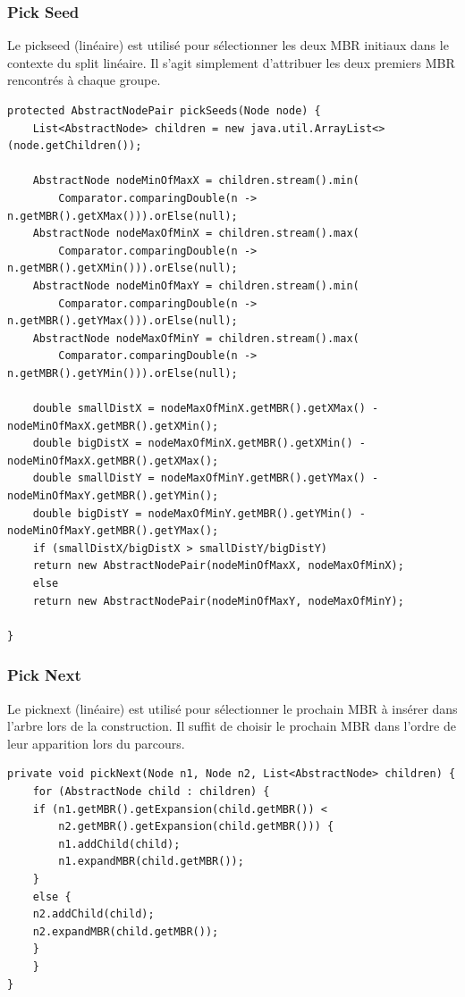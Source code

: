 \documentclass {article}
\begin{document}
\subsubsection {Pick Seed}

Le pickseed (linéaire) est utilisé pour sélectionner les deux MBR initiaux dans le contexte du split linéaire. 
Il s'agit simplement d'attribuer les deux premiers MBR rencontrés à chaque groupe.


\begin{verbatim}
protected AbstractNodePair pickSeeds(Node node) {
    List<AbstractNode> children = new java.util.ArrayList<>(node.getChildren());

    AbstractNode nodeMinOfMaxX = children.stream().min(
	    Comparator.comparingDouble(n -> n.getMBR().getXMax())).orElse(null);
    AbstractNode nodeMaxOfMinX = children.stream().max(
	    Comparator.comparingDouble(n -> n.getMBR().getXMin())).orElse(null);
    AbstractNode nodeMinOfMaxY = children.stream().min(
	    Comparator.comparingDouble(n -> n.getMBR().getYMax())).orElse(null);
    AbstractNode nodeMaxOfMinY = children.stream().max(
	    Comparator.comparingDouble(n -> n.getMBR().getYMin())).orElse(null);

    double smallDistX = nodeMaxOfMinX.getMBR().getXMax() - nodeMinOfMaxX.getMBR().getXMin();
    double bigDistX = nodeMaxOfMinX.getMBR().getXMin() - nodeMinOfMaxX.getMBR().getXMax();
    double smallDistY = nodeMaxOfMinY.getMBR().getYMax() - nodeMinOfMaxY.getMBR().getYMin();
    double bigDistY = nodeMaxOfMinY.getMBR().getYMin() - nodeMinOfMaxY.getMBR().getYMax();
    if (smallDistX/bigDistX > smallDistY/bigDistY) 
	return new AbstractNodePair(nodeMinOfMaxX, nodeMaxOfMinX);
    else
	return new AbstractNodePair(nodeMinOfMaxY, nodeMaxOfMinY);

}
\end{verbatim}

\subsubsection {Pick Next}

Le picknext (linéaire) est utilisé pour sélectionner le prochain MBR à insérer dans l'arbre lors de la construction. 
Il suffit de choisir le prochain MBR dans l'ordre de leur apparition lors du parcours.


\begin{verbatim}
private void pickNext(Node n1, Node n2, List<AbstractNode> children) {
    for (AbstractNode child : children) {
	if (n1.getMBR().getExpansion(child.getMBR()) < 
		n2.getMBR().getExpansion(child.getMBR())) {
	    n1.addChild(child);
	    n1.expandMBR(child.getMBR());
	} 
	else {
	n2.addChild(child);
	n2.expandMBR(child.getMBR());
	}
    }
}
\end{verbatim}
\end{document}
